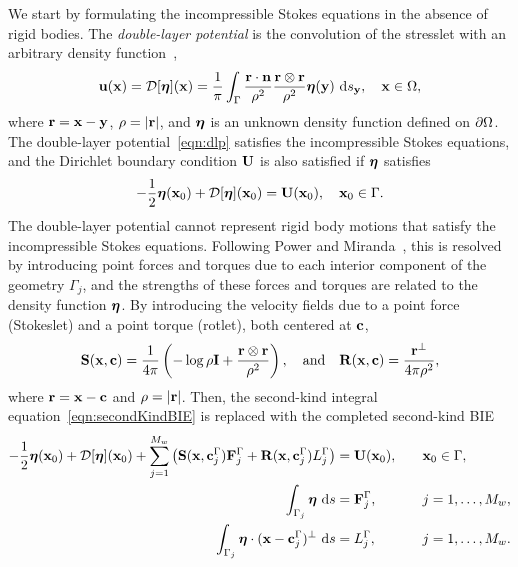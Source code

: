 \documentclass[preprint, 10pt]{elsarticle}
\begin{document}
We start by formulating the incompressible Stokes equations in the
absence of rigid bodies.  The {\em double-layer potential} is the
convolution of the stresslet with an arbitrary density
function~\cite{Ladyzhenskaya1963, Pozrikidis1992},
\begin{align}
  \label{eqn:dlp}
  {\mathbf{u}}({\mathbf{x}}) = {\mathcal{D}}[{\boldsymbol\eta}]({\mathbf{x}}) = \frac{1}{\pi}\int_{\Gamma}
  \frac{{\mathbf{r}}\cdot{\mathbf{n}}}{\rho^2}\frac{{\mathbf{r}} \otimes {\mathbf{r}}}{\rho^2}
  {\boldsymbol\eta}({\mathbf{y}})~\text{d}s_{{\mathbf{y}}}, \quad {\mathbf{x}} \in \Omega,
\end{align}
where ${\mathbf{r}} = {\mathbf{x}} - {\mathbf{y}}$, $\rho=|{\mathbf{r}}|$, and ${\boldsymbol\eta}$ is an unknown density
function defined on ${\partial}\Omega$.  The double-layer
potential~\eqref{eqn:dlp} satisfies the incompressible Stokes equations,
and the Dirichlet boundary condition ${\mathbf{U}}$ is also satisfied if
${\boldsymbol\eta}$ satisfies~\cite{Pozrikidis1992}
\begin{align}
  -\frac{1}{2} {\boldsymbol\eta}({\mathbf{x}}_0) + {\mathcal{D}}[{\boldsymbol\eta}]({\mathbf{x}}_0) = {\mathbf{U}}({\mathbf{x}}_0), 
    \quad {\mathbf{x}}_0 \in \Gamma.
  \label{eqn:secondKindBIE}
\end{align}
The double-layer potential cannot represent rigid body motions that
satisfy the incompressible Stokes equations.  Following Power and
Miranda~\cite{Power1987, Power1993}, this is resolved by introducing
point forces and torques due to each interior component of the geometry
$\Gamma_j$, and the strengths of these forces and torques are related to
the density function ${\boldsymbol\eta}$.  By introducing the velocity fields due to
a point force (Stokeslet) and a point torque (rotlet), both centered at
${\mathbf{c}}$,
\begin{align*}
  \mathbf{S}({\mathbf{x}},{\mathbf{c}}) = \frac{1}{4\pi}\left(-\log\rho\mathbf{I} + 
  \frac{{\mathbf{r}} \otimes {\mathbf{r}}}{\rho^2}\right), \quad \text{and} \quad
  \mathbf{R}({\mathbf{x}},{\mathbf{c}}) = \frac{{\mathbf{r}}^\perp}{4\pi\rho^2},
\end{align*}
where ${\mathbf{r}} = {\mathbf{x}} - {\mathbf{c}}$ and $\rho = |{\mathbf{r}}|$.  Then, the second-kind
integral equation~\eqref{eqn:secondKindBIE} is replaced with the
completed second-kind BIE
\begin{equation}
  \label{eqn:completed_DLP}
  \begin{split}
  -\frac{1}{2}{\boldsymbol\eta}({\mathbf{x}}_0) + {\mathcal{D}}[{\boldsymbol\eta}]({\mathbf{x}}_0) + 
    \sum_{j=1}^{M_w} \left(\mathbf{S}({\mathbf{x}},{\mathbf{c}}^\Gamma_j){\mathbf{F}}^\Gamma_j + 
      \mathbf{R}({\mathbf{x}},{\mathbf{c}}^\Gamma_j)L^\Gamma_j\right) &= {\mathbf{U}}({\mathbf{x}}_0),
      \quad &&{\mathbf{x}}_0 \in \Gamma, \\
  \int_{\Gamma_j} {\boldsymbol\eta}~\text{d}s &= {\mathbf{F}}^\Gamma_j, 
      &&j=1,\ldots,M_w, \\
  \int_{\Gamma_j} {\boldsymbol\eta}\cdot ({\mathbf{x}} - {\mathbf{c}}^\Gamma_j)^\perp~\text{d}s &=   
      L^\Gamma_j, &&j=1,\ldots,M_w.
  \end{split}
\end{equation}
\end{document}
